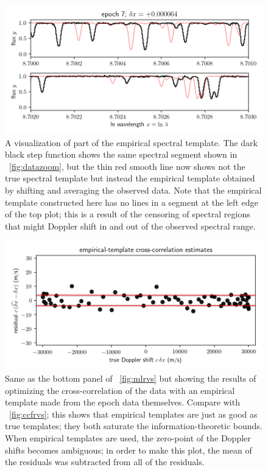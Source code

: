 \documentclass[modern]{aastex631}
\newcommand{\figref}[1]{\figurename~\ref{#1}}
\begin{document}
\begin{figure}[tp]
  \begin{mdframed}
    \begin{center}
    \includegraphics[width=\textwidth]{../notebook/empirical.png}
    \end{center}
    \caption{A visualization of part of the empirical spectral template. The dark black step function shows the same spectral segment shown in \figref{fig:datazoom}, but the thin red smooth line now shows not the true spectral template but instead the empirical template obtained by shifting and averaging the observed data. Note that the empirical template constructed here has no lines in a segment at the left edge of the top plot; this is a result of the censoring of spectral regions that might Doppler shift in and out of the observed spectral range.\label{fig:empirical}}
  \end{mdframed}
\end{figure}
\begin{figure}[tp]
  \begin{mdframed}
    \begin{center}
    \includegraphics[width=\textwidth]{../notebook/empiricalrvs.png}
    \end{center}
    \caption{Same as the bottom panel of \figref{fig:mlrvs} but showing the results of optimizing the cross-correlation of the data with an empirical template made from the epoch data themselves. Compare with \figref{fig:ccfrvs}; this shows that empirical templates are just as good as true templates; they both saturate the information-theoretic bounds. When empirical templates are used, the zero-point of the Doppler shifts becomes ambiguous; in order to make this plot, the mean of the residuals was subtracted from all of the residuals.\label{fig:empiricalrvs}}
  \end{mdframed}
\end{figure}
\end{document}
